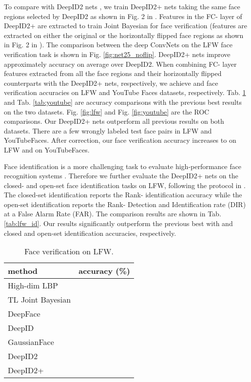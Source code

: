 \documentclass[10pt,twocolumn,letterpaper]{article}
\begin{document}
To compare with DeepID2 nets \cite{sun2014b}, we train  DeepID2+ nets taking the same  face regions selected by DeepID2 as shown in Fig. 2 in \cite{sun2014b}. Features in the FC- layer of DeepID2+ are extracted to train Joint Bayesian for face verification (features are extracted on either the original or the horizontally flipped face regions as shown in Fig. 2 in \cite{sun2014b}). The comparison between the  deep ConvNets on the LFW face verification task is shown in Fig. \ref{fig:net25_noflip}. DeepID2+ nets improve approximately  accuracy on average over DeepID2. When combining FC- layer features extracted from all the  face regions and their horizontally flipped counterparts with the  DeepID2+ nets, respectively, we achieve  and  face verification accuracies on LFW and YouTube Faces datasets, respectively. Tab. \ref{tab:lfw} and Tab. \ref{tab:youtube} are accuracy comparisons with the previous best results on the two datasets. Fig. \ref{fig:lfw} and Fig. \ref{fig:youtube} are the  ROC  comparisons. Our DeepID2+ nets outperform all previous results on both datasets. There are a few wrongly labeled test face pairs in LFW and YouTubeFaces. After correction, our face verification accuracy  increases  to  on LFW and  on YouTubeFaces.

Face identification is a more challenging task to evaluate high-performance face recognition systems \cite{taigman2014b}. Therefore we further evaluate the  DeepID2+ nets on the closed- and open-set face identification tasks on LFW, following the protocol  in \cite{best-rowden2014}. The closed-set identification reports the Rank- identification accuracy while the open-set identification  reports the Rank- Detection and Identification rate (DIR) at a  False Alarm Rate (FAR). The comparison results are shown in Tab. \ref{tab:lfw_id}. Our results significantly outperform the previous best \cite{taigman2014b} with  and  closed and open-set identification accuracies, respectively.

\begin{table}[t]
\caption{Face verification on LFW.}
\label{tab:lfw}
\vspace{-0.1in}
\begin{center}
\begin{tabular}{p{100pt}|p{100pt}}
\toprule
method & accuracy (\%) \\
\midrule
High-dim LBP \cite{chen2013} &  \\
TL Joint Bayesian \cite{cao2013} &  \\
DeepFace \cite{taigman2014a} &  \\
DeepID \cite{sun2014a} &  \\
GaussianFace \cite{lu2014} &  \\
DeepID2 \cite{sun2014b} &  \\
DeepID2+ &  \\
\bottomrule
\end{tabular}
\end{center}
\vspace{-0.1in}
\end{table}
\end{document}

